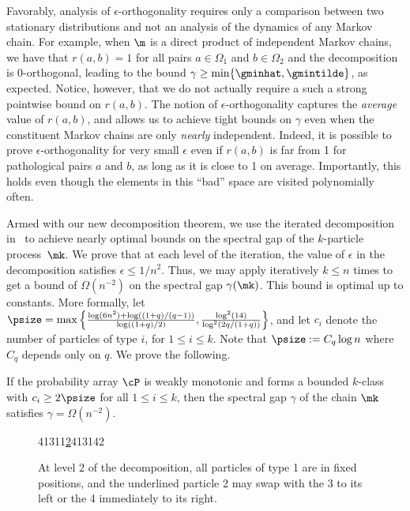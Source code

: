 \documentclass{toc}
\begin{document}
Favorably, analysis of $\epsilon$-orthogonality requires only a 
comparison between two stationary distributions and not an analysis of 
the dynamics of any Markov chain.  For example, when $\m$ is a direct 
product of independent Markov chains, we have that $r(a,b)=1$ for all 
pairs $a\in\Omega_1$ and $b\in\Omega_2$ and the decomposition is 
$0$-orthogonal, leading to the bound $\gamma\geq 
\min\{\gminhat,\gmintilde\}$, as expected.  Notice, however, that we do 
not actually require a such a strong pointwise bound on $r(a,b)$.  The 
notion of $\epsilon$-orthogonality captures the \emph{average} value of 
$r(a,b)$, and allows us to achieve tight bounds on $\gamma$ even when 
the constituent Markov chains are only \emph{nearly} independent.  
Indeed, it is possible to prove %
$\epsilon$-orthogonality for very small $\epsilon$ %
even if 
$r(a,b)$ is far from 1 for pathological pairs $a$ and $b$, as long as 
it is close to 1 on average. Importantly, this holds even though the 
elements in this ``bad'' space are visited polynomially often.  

Armed with our new decomposition theorem, we use the iterated 
decomposition in~\cite{MS} to achieve nearly optimal bounds on the 
spectral gap of the $k$-particle process~$\mk$. We prove that at each
level of the iteration, %
the value of $\epsilon$ in the decomposition satisfies $\epsilon\leq 1/n^2$. %
%
Thus, we may apply  iteratively $k\leq 
n$ times to get a bound of $\Omega(n^{-2})$ on the spectral gap 
$\gamma(\mk)$.  This bound is optimal up to constants. More formally, 
let $\psize = \max\left\{\frac{\log 
(6n^2)+\log((1+q)/(q-1))}{\log((1+q)/2)},  
\frac{\log^2(14)}{\log^2(2q/(1+q))}\right\}$, %
and let 
$c_i$ denote the number of particles of type $i$, for $1\leq i\leq k$.  
Note that $\psize := C_q \log n$  where $C_q$ depends only on $q.$
We prove the following.

\newtheorem*{thm:mk}{}

\begin{theorem}\label{pprocess}
%
%
If the probability array $\cP$ is   %
weakly monotonic and %
forms  %
a bounded $k$-class
with  $c_i\geq 2\psize$ for all $1\leq i \leq k$, 
then the spectral gap $\gamma$ of the chain $\mk$ satisfies
\abovedisplayskip=3pt
\belowdisplayskip=3pt
$\gamma =\Omega(n^{-2}).$
\end{theorem}

\begin{figure}[]
  \centering
    \newcommand{\one}{{\color{gray}1}}
     {\color{red} 4\one 3\one \one \underline{2}4\one 3\one 42}\\
    \caption{At level 2 of the decomposition, all particles of type 1 are in fixed positions, and the underlined particle 2 may swap with the 3 to its left or the 4 immediately to its right.}
\label{fig:SwapAcross}
\end{figure}
\end{document}
